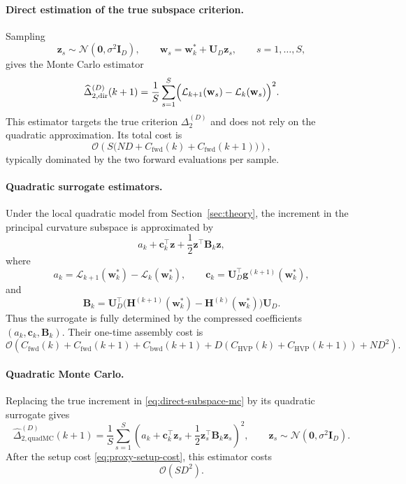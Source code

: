 \documentclass[10pt]{article}
\theoremstyle{plain}
\theoremstyle{remark}
\begin{document}
\paragraph{Direct estimation of the true subspace criterion.}
Sampling
\[
\mathbf z_s \sim \mathcal N(\mathbf 0,\sigma^2\mathbf I_D),
\qquad
\mathbf w_s=\mathbf w_k^*+\mathbf U_D\mathbf z_s,
\qquad
s=1,\dots,S,
\]
gives the Monte Carlo estimator
\begin{equation}
\label{eq:direct-subspace-mc}
\widehat{\Delta}_{2,\mathrm{dir}}^{(D)}(k+1)
=
\frac{1}{S}\sum_{s=1}^S
\Bigl(
\mathcal L_{k+1}(\mathbf w_s)-\mathcal L_k(\mathbf w_s)
\Bigr)^2.
\end{equation}
This estimator targets the true criterion $\Delta_2^{(D)}$ and does not rely on the quadratic approximation.
Its total cost is
\[
\mathcal O\!\left(
S\bigl(
ND + C_{\mathrm{fwd}}(k)+C_{\mathrm{fwd}}(k+1)
\bigr)
\right),
\]
typically dominated by the two forward evaluations per sample.

\paragraph{Quadratic surrogate estimators.}
Under the local quadratic model from Section~\ref{sec:theory}, the increment in the principal curvature subspace is approximated by
\[
a_k + \mathbf c_k^\top \mathbf z + \frac12 \mathbf z^\top \mathbf B_k \mathbf z,
\]
where
\[
a_k = \mathcal L_{k+1}(\mathbf w_k^*)-\mathcal L_k(\mathbf w_k^*),\qquad
\mathbf c_k = \mathbf U_D^\top \mathbf g^{(k+1)}(\mathbf w_k^*),
\]
and
\[
\mathbf B_k
=
\mathbf U_D^\top
\bigl(
\mathbf H^{(k+1)}(\mathbf w_k^*)-\mathbf H^{(k)}(\mathbf w_k^*)
\bigr)
\mathbf U_D.
\]
Thus the surrogate is fully determined by the compressed coefficients $(a_k,\mathbf c_k,\mathbf B_k)$.
Their one-time assembly cost is
\begin{equation}
\label{eq:proxy-setup-cost}
\mathcal O\!\left(
C_{\mathrm{fwd}}(k)+C_{\mathrm{fwd}}(k+1)
+
C_{\mathrm{bwd}}(k+1)
+
D(C_{\mathrm{HVP}}(k)+C_{\mathrm{HVP}}(k+1))
+
ND^2
\right).
\end{equation}

\paragraph{Quadratic Monte Carlo.}
Replacing the true increment in \eqref{eq:direct-subspace-mc} by its quadratic surrogate gives
\begin{equation}
\label{eq:quad-subspace-mc}
\widehat{\Delta}_{2,\mathrm{quadMC}}^{(D)}(k+1)
=
\frac{1}{S}\sum_{s=1}^S
\left(
a_k + \mathbf c_k^\top \mathbf z_s + \frac12 \mathbf z_s^\top \mathbf B_k \mathbf z_s
\right)^2,
\qquad
\mathbf z_s \sim \mathcal N(\mathbf 0,\sigma^2\mathbf I_D).
\end{equation}
After the setup cost \eqref{eq:proxy-setup-cost}, this estimator costs
\[
\mathcal O(SD^2).
\]
\end{document}
